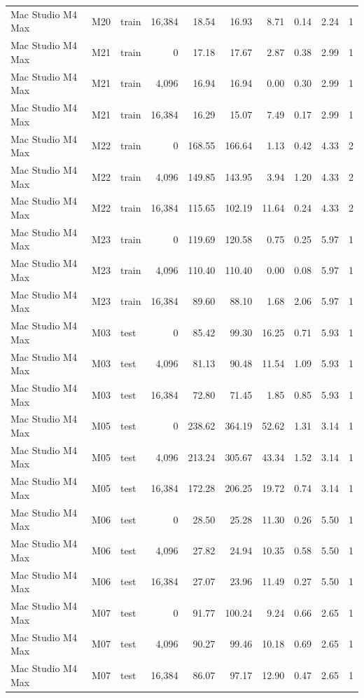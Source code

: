 \documentclass[10pt]{article}
\begin{document}
\begin{landscape}
\begin{longtable}{@{}l l l r r r r r r r@{}}
Mac Studio M4 Max & M20 & train & 16,384 & 18.54 & 16.93 & 8.71 & 0.14 & 2.24 & 1 \\
Mac Studio M4 Max & M21 & train & 0 & 17.18 & 17.67 & 2.87 & 0.38 & 2.99 & 1 \\
Mac Studio M4 Max & M21 & train & 4,096 & 16.94 & 16.94 & 0.00 & 0.30 & 2.99 & 1 \\
Mac Studio M4 Max & M21 & train & 16,384 & 16.29 & 15.07 & 7.49 & 0.17 & 2.99 & 1 \\
Mac Studio M4 Max & M22 & train & 0 & 168.55 & 166.64 & 1.13 & 0.42 & 4.33 & 2 \\
Mac Studio M4 Max & M22 & train & 4,096 & 149.85 & 143.95 & 3.94 & 1.20 & 4.33 & 2 \\
Mac Studio M4 Max & M22 & train & 16,384 & 115.65 & 102.19 & 11.64 & 0.24 & 4.33 & 2 \\
Mac Studio M4 Max & M23 & train & 0 & 119.69 & 120.58 & 0.75 & 0.25 & 5.97 & 1 \\
Mac Studio M4 Max & M23 & train & 4,096 & 110.40 & 110.40 & 0.00 & 0.08 & 5.97 & 1 \\
Mac Studio M4 Max & M23 & train & 16,384 & 89.60 & 88.10 & 1.68 & 2.06 & 5.97 & 1 \\
Mac Studio M4 Max & M03 & test & 0 & 85.42 & 99.30 & 16.25 & 0.71 & 5.93 & 1 \\
Mac Studio M4 Max & M03 & test & 4,096 & 81.13 & 90.48 & 11.54 & 1.09 & 5.93 & 1 \\
Mac Studio M4 Max & M03 & test & 16,384 & 72.80 & 71.45 & 1.85 & 0.85 & 5.93 & 1 \\
Mac Studio M4 Max & M05 & test & 0 & 238.62 & 364.19 & 52.62 & 1.31 & 3.14 & 1 \\
Mac Studio M4 Max & M05 & test & 4,096 & 213.24 & 305.67 & 43.34 & 1.52 & 3.14 & 1 \\
Mac Studio M4 Max & M05 & test & 16,384 & 172.28 & 206.25 & 19.72 & 0.74 & 3.14 & 1 \\
Mac Studio M4 Max & M06 & test & 0 & 28.50 & 25.28 & 11.30 & 0.26 & 5.50 & 1 \\
Mac Studio M4 Max & M06 & test & 4,096 & 27.82 & 24.94 & 10.35 & 0.58 & 5.50 & 1 \\
Mac Studio M4 Max & M06 & test & 16,384 & 27.07 & 23.96 & 11.49 & 0.27 & 5.50 & 1 \\
Mac Studio M4 Max & M07 & test & 0 & 91.77 & 100.24 & 9.24 & 0.66 & 2.65 & 1 \\
Mac Studio M4 Max & M07 & test & 4,096 & 90.27 & 99.46 & 10.18 & 0.69 & 2.65 & 1 \\
Mac Studio M4 Max & M07 & test & 16,384 & 86.07 & 97.17 & 12.90 & 0.47 & 2.65 & 1 \\

\end{longtable}
\end{landscape}
\end{document}
